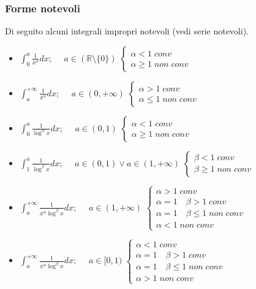 \documentclass{article}
\newcommand{\R}{\mathds{R}}
\begin{document}
\subsubsection{Forme notevoli}
Di seguito alcuni integrali impropri notevoli (vedi serie notevoli).
\begin{itemize}
    \item $\int_0^a\frac{1}{x^\alpha}dx;$ $\quad a\in(\R\setminus \{0\})$ $\begin{cases} \alpha<1\;conv \\ \alpha\geq1\;non\;conv \end{cases}$
    
    \item $\int_a^{+\infty}\frac{1}{x^\alpha}dx;$ $\quad a\in(0,+\infty)$ $\begin{cases} \alpha>1\;conv \\ \alpha\leq1\;non\;conv \end{cases}$
    
    \item $\int_0^a\frac{1}{\log^\alpha x}dx;$ $\quad a\in(0,1)$ $\begin{cases} \alpha<1\;conv \\ \alpha\geq1\;non\;conv \end{cases}$
    
    \item $\int_1^a\frac{1}{\log^\beta x}dx;$ $\quad a\in(0,1)\vee a\in(1,+\infty)$ $\begin{cases} \beta<1\;conv \\ \beta\geq1\;non\;conv \end{cases}$
    
    \item $\int_a^{+\infty}\frac{1}{x^\alpha\log^\beta x}dx;$ $\quad a\in(1,+\infty)$ $\begin{cases} \alpha>1\;conv \\ \alpha=1\quad \beta>1\;conv \\ \alpha=1\quad \beta\leq1\;non\;conv\\ \alpha<1\;non\;conv \end{cases}$
    
    \item $\int_a^{+\infty}\frac{1}{x^\alpha\log^\beta x}dx;$ $\quad a\in[0,1)$ $\begin{cases} \alpha<1\;conv \\ \alpha=1\quad \beta>1\;conv \\ \alpha=1\quad \beta\leq1\;non\;conv\\ \alpha>1\;non\;conv \end{cases}$

\end{itemize}
\end{document}

